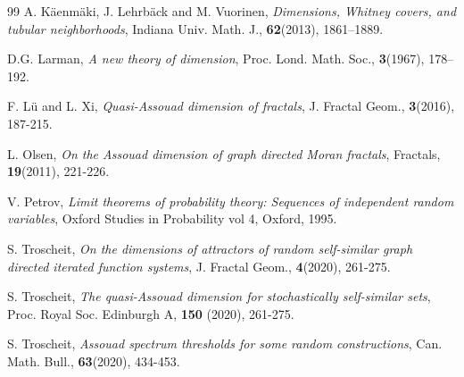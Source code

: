 \documentclass{amsart}
\theoremstyle{plain}
\numberwithin{equation}{section}
\begin{document}
\begin{thebibliography}{99}
 A. K\"{a}enm\"{a}ki, J. Lehrb\"{a}ck and M. Vuorinen, 
\textit{Dimensions, Whitney covers, and tubular neighborhoods}, Indiana Univ. Math.
J., \textbf{62}(2013), 1861--1889.

 D.G. Larman, \textit{A new theory of dimension}, Proc. Lond.
Math. Soc., \textbf{3}(1967), 178--192.

 F. L\"{u} and L. Xi, \textit{Quasi-Assouad dimension of fractals}, 
J. Fractal Geom., \textbf{3}(2016), 187-215.

 L. Olsen, \textit{On the Assouad dimension of graph directed Moran fractals},
Fractals, \textbf{19}(2011), 221-226.

 V. Petrov, \textit{Limit theorems of probability theory:
Sequences of independent random variables}, Oxford Studies in Probability
vol 4, Oxford, 1995.

 S. Troscheit, \textit{On the dimensions of attractors of random self-similar graph directed iterated function
systems}, J. Fractal Geom., \textbf{4}(2020), 261-275.

 S. Troscheit, \textit{The quasi-Assouad dimension for
stochastically self-similar sets}, Proc. Royal Soc. Edinburgh A, \textbf{150}%
(2020), 261-275.

 S. Troscheit, \textit{Assouad spectrum thresholds for some
random constructions}, Can. Math. Bull., \textbf{63}(2020), 434-453.

\end{thebibliography}
\end{document}
